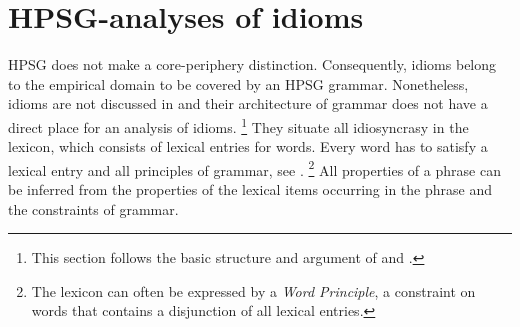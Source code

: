 \documentclass[output=paper]{langsci/langscibook}
\begin{document}








\section{HPSG-analyses of idioms}
\label{Sec-Analyses}



HPSG does not make a core-periphery distinction. Consequently, idioms belong to the empirical domain to be covered by an HPSG grammar.
Nonetheless, idioms are not discussed in \cite{ps2} and their architecture of grammar does not have a direct place for an analysis of idioms.%
\footnote{This section follows the basic structure and argument of \cite{Sailer:12} and \cite{Richter:Sailer:14}.} 
They situate all idiosyncrasy in the lexicon, which consists of lexical entries for words. 
Every word has to satisfy a lexical entry and all principles of grammar, see .%
\footnote{The lexicon can often be expressed by a \emph{Word Principle}, a constraint on words that contains a disjunction of all lexical entries.}
%
All properties of a phrase can be inferred from the properties of the lexical items occurring in the phrase and the constraints of grammar. 
\end{document}
